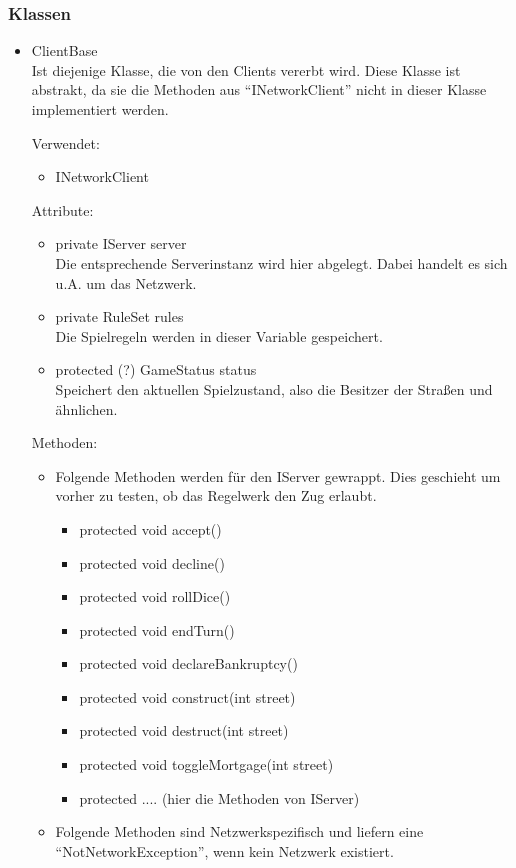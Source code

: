 \documentclass[a4paper,10pt]{article}
\begin{document}
\subsubsection{Klassen}
\begin{itemize}
\item ClientBase\\
Ist diejenige Klasse, die von den Clients vererbt wird. Diese Klasse ist abstrakt, da sie die Methoden aus "`INetworkClient"' nicht in dieser Klasse implementiert werden.

Verwendet:
\begin{itemize}
\item INetworkClient
\end{itemize}
Attribute:
\begin{itemize}
\item private IServer server \\
Die entsprechende Serverinstanz wird hier abgelegt. Dabei handelt es sich u.A. um das Netzwerk.
\item private RuleSet rules \\
Die Spielregeln werden in dieser Variable gespeichert.
\item protected (?) GameStatus status \\
Speichert den aktuellen Spielzustand, also die Besitzer der Straßen und ähnlichen.
\end{itemize}
Methoden:
\begin{itemize}
\item Folgende Methoden werden für den IServer gewrappt. Dies geschieht um vorher zu testen, ob das Regelwerk den Zug erlaubt.
\begin{itemize}
\item protected void accept()
\item protected void decline()
\item protected void rollDice()
\item protected void endTurn()
\item protected void declareBankruptcy()
\item protected void construct(int street)
\item protected void destruct(int street)
\item protected void toggleMortgage(int street)
\item protected .... (hier die Methoden von IServer) \\
\end{itemize}
\item Folgende Methoden sind Netzwerkspezifisch und liefern eine "`NotNetworkException"', wenn kein Netzwerk existiert.

\end{itemize}
\end{itemize}
\end{document}
